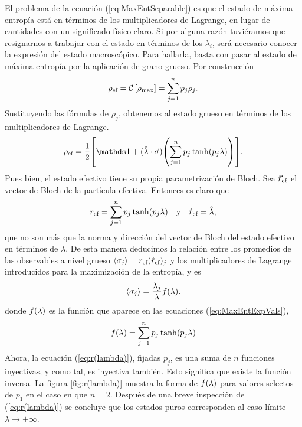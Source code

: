 

El problema de la ecuación (\ref{eq:MaxEntSeparable}) es que el estado de máxima entropía está en términos de los multiplicadores de Lagrange, en lugar de cantidades con un significado físico claro. Si por alguna razón tuviéramos que resignarnos a trabajar con el estado en términos de los $\lambda_{i}$, será necesario conocer la expresión del estado macroscópico. Para hallarla, basta con pasar al estado de máxima entropía por la aplicación de grano grueso. Por construcción 
\begin{equation}
    \rho_{\text{ef}}=\mathcal{C}\left[\varrho_{\max}\right]=\sum_{j=1}^{n}p_{j}\rho_{j}.\nonumber
\end{equation}
Sustituyendo las fórmulas de $\rho_{j}$, obtenemos al estado grueso en términos de los multiplicadores de Lagrange.
\begin{equation}\label{eq:CG(MaxEnt)}
    \rho_{\ef}=\frac{1}{2}\qty[\Id+(\paulivec{\lambda})\qty(\sum_{j=1}^{n}p_{j}\tanh(p_{j}\lambda))].
\end{equation}
Pues bien, el estado efectivo tiene su propia parametrización de Bloch. Sea $\vec{r}_{\text{ef}}$ el vector de Bloch de la partícula efectiva. Entonces es claro que
\begin{align}
    r_{\text{ef}}=\sum_{j=1}^{n}p_{j}\tanh(p_{j}\lambda) && \text{y} && \hat{r}_{\text{ef}}=\hat{\lambda},\nonumber
\end{align}
que no son más que la norma y dirección del vector de Bloch del estado efectivo en términos de $\lambda$. De esta manera deducimos la relación entre los promedios de las observables a nivel grueso $\expval{\sigma_{j}}=r_{\text{ef}}(\hat{r}_{\text{ef}})_{j}$ y los multiplicadores de Lagrange introducidos para la maximización de la entropía, y es
\begin{equation}
    \expval{\sigma_{j}}=\frac{\lambda_{j}}{\lambda}f(\lambda).
\end{equation}
donde $f(\lambda)$ es la función que aparece en las ecuaciones (\ref{eq:MaxEntExpVals}),
\begin{equation}\label{eq:r(lambda)}
    f(\lambda)=\sum_{j=1}^{n}p_{j}\tanh(p_{j}\lambda)
\end{equation}
Ahora, la ecuación (\ref{eq:r(lambda)}), fijadas $p_{j}$, es una suma de $n$ funciones inyectivas, y como tal, es inyectiva también. Esto significa que existe la función inversa. La figura \ref{fig:r(lambda)} muestra la forma de $f(\lambda)$ para valores selectos de $p_{1}$ en el caso en que $n=2$. Después de una breve inspección de (\ref{eq:r(lambda)}) se concluye que los estados puros corresponden al caso límite $\lambda\rightarrow+\infty$.

